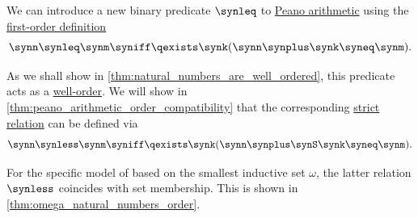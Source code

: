 \begin{definition}\label{def:peano_arithmetic_ordering}
  We can introduce a new binary predicate \( \synleq \) to \hyperref[def:peano_arithmetic]{Peano arithmetic} using the \hyperref[def:fol_definition/predicate]{first-order definition}
  \begin{equation}\label{eq:def:peano_arithmetic_ordering/nonstrict}
    \synn \synleq \synm \syniff \qexists \synk (\synn \synplus \synk \syneq \synm).
  \end{equation}

  As we shall show in \cref{thm:natural_numbers_are_well_ordered}, this predicate acts as a \hyperref[def:well_ordered_set]{well-order}. We will show in \cref{thm:peano_arithmetic_order_compatibility} that the corresponding \hyperref[def:partially_ordered_set/strict]{strict relation} can be defined via
  \begin{equation}\label{eq:def:peano_arithmetic_ordering/strict}
    \synn \synless \synm \syniff \qexists \synk (\synn \synplus \synS \synk \syneq \synm).
  \end{equation}
\end{definition}
\begin{comments}
  \item For the specific model of  based on the smallest inductive set \( \omega \), the latter relation \( \synless \) coincides with set membership. This is shown in \cref{thm:omega_natural_numbers_order}.
\end{comments}

